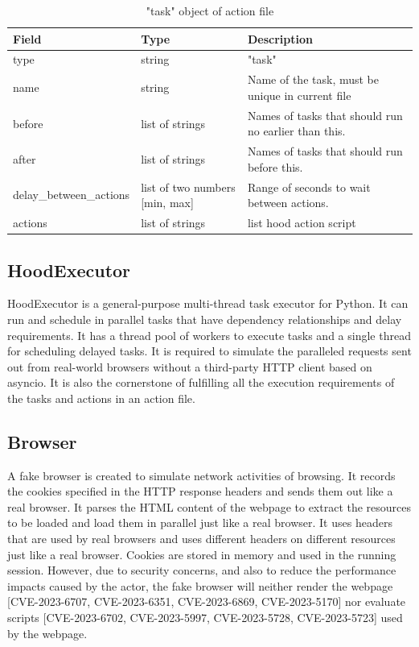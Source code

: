 \documentclass[mscthesis]{usiinfthesis}
\begin{document}
\begin{table}[H]
  \centering
  \begin{tabular}{|p{34mm}|p{26mm}|p{65mm}|}
    \hline
    Field                   & Type                           & Description                                          \\
    \hline
    type                    & string                         & "task"                                               \\
    name                    & string                         & Name of the task, must be unique in current file     \\
    before                  & list of strings                & Names of tasks that should run no earlier than this. \\
    after                   & list of strings                & Names of tasks that should run before this.          \\
    delay\_between\_actions & list of two numbers [min, max] & Range of seconds to wait between actions.            \\
    actions                 & list of strings                & list hood action script                              \\
    \hline
  \end{tabular}
  \caption{"task" object of action file}
  \label{tab:task_object}
\end{table}

\subsection{HoodExecutor}
HoodExecutor is a general-purpose multi-thread task executor for Python. It can run and schedule in parallel tasks that have dependency relationships and delay requirements. It has a thread pool of workers to execute tasks and a single thread for scheduling delayed tasks. It is required to simulate the paralleled requests sent out from real-world browsers without a third-party HTTP client based on asyncio. It is also the cornerstone of fulfilling all the execution requirements of the tasks and actions in an action file.

\subsection{Browser}\label{sec:browser}
A fake browser is created to simulate network activities of browsing. It records the cookies specified in the HTTP response headers and sends them out like a real browser. It parses the HTML content of the webpage to extract the resources to be loaded and load them in parallel just like a real browser. It uses headers that are used by real browsers and uses different headers on different resources just like a real browser. Cookies are stored in memory and used in the running session. However, due to security concerns, and also to reduce the performance impacts caused by the actor, the fake browser will neither render the webpage [CVE-2023-6707, CVE-2023-6351, CVE-2023-6869, CVE-2023-5170] nor evaluate scripts [CVE-2023-6702, CVE-2023-5997, CVE-2023-5728, CVE-2023-5723] used by the webpage.
\end{document}
